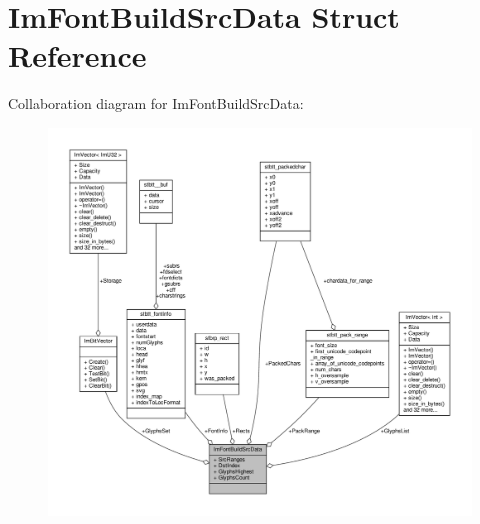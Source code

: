 \hypertarget{structImFontBuildSrcData}{}\section{Im\+Font\+Build\+Src\+Data Struct Reference}
\label{structImFontBuildSrcData}


Collaboration diagram for Im\+Font\+Build\+Src\+Data\+:
\nopagebreak
\begin{figure}[H]
\begin{center}
\leavevmode
\includegraphics[width=350pt]{structImFontBuildSrcData__coll__graph}
\end{center}
\end{figure}
